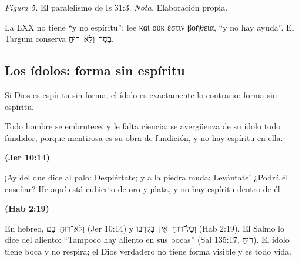 \documentclass[11pt,letterpaper]{article}
\newcommand{\heb}[1]{\mbox{\foreignlanguage{hebrew}{#1}}}
\newcommand{\grc}[1]{\foreignlanguage{ancientgreek}{#1}}
\newcommand{\fuente}[1]{\par\hfill{\upshape\bfseries\small\textcolor{azul}{#1}}}
\begin{document}
\begin{center}
\par
{\footnotesize\color{gris}\textit{Figura 5.} El paralelismo de Is 31:3. \textit{Nota.} Elaboración propia.}
\end{center}

\begin{nota}
La LXX no tiene ``y no espíritu'': lee \grc{καὶ οὐκ ἔστιν βοήθεια}, ``y no hay ayuda''. El Targum conserva \heb{בְּסַר וְלָא רוּחַ}.
\end{nota}

\subsection{Los ídolos: forma sin espíritu}

Si Dios es espíritu sin forma, el ídolo es exactamente lo contrario: forma sin espíritu.

\begin{cita}Todo hombre se embrutece, y le falta ciencia; se avergüenza de su ídolo todo fundidor, porque mentirosa es su obra de fundición, y no hay espíritu en ella.\fuente{(Jer 10:14)}\end{cita}

\begin{cita}¡Ay del que dice al palo: Despiértate; y a la piedra muda: Levántate! ¿Podrá él enseñar? He aquí está cubierto de oro y plata, y no hay espíritu dentro de él.\fuente{(Hab 2:19)}\end{cita}

En hebreo, \heb{וְלֹא־רוּחַ בָּם} (Jer 10:14) y \heb{וְכָל־רוּחַ אֵין בְּקִרְבּוֹ} (Hab 2:19). El Salmo lo dice del aliento: ``Tampoco hay aliento en sus bocas'' (Sal 135:17, \heb{רוּחַ}). El ídolo tiene boca y no respira; el Dios verdadero no tiene forma visible y es todo vida.
\end{document}
